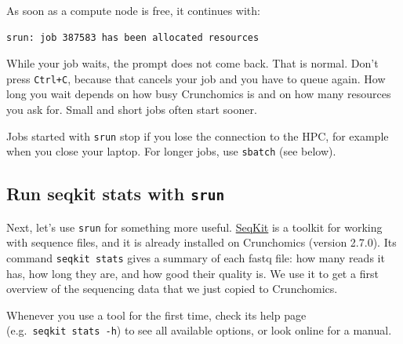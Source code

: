 \documentclass[
  letterpaper,
  DIV=11,
  numbers=noendperiod]{scrreprt}
\begin{document}
As soon as a compute node is free, it continues with:

\begin{verbatim}
srun: job 387583 has been allocated resources
\end{verbatim}

While your job waits, the prompt does not come back. That is normal.
Don't press \texttt{Ctrl+C}, because that cancels your job and you have
to queue again. How long you wait depends on how busy Crunchomics is and
on how many resources you ask for. Small and short jobs often start
sooner.

\begin{tcolorbox}[enhanced jigsaw, colbacktitle=quarto-callout-important-color!10!white, rightrule=.15mm, leftrule=.75mm, colback=white, opacitybacktitle=0.6, title=\textcolor{quarto-callout-important-color}{\faExclamation}\hspace{0.5em}{Important}, bottomrule=.15mm, left=2mm, colframe=quarto-callout-important-color-frame, opacityback=0, breakable, bottomtitle=1mm, coltitle=black, arc=.35mm, toprule=.15mm, toptitle=1mm, titlerule=0mm]

Jobs started with \texttt{srun} stop if you lose the connection to the
HPC, for example when you close your laptop. For longer jobs, use
\texttt{sbatch} (see below).

\end{tcolorbox}

\subsection{\texorpdfstring{Run seqkit stats with
\texttt{srun}}{Run seqkit stats with srun}}\label{run-seqkit-stats-with-srun}

Next, let's use \texttt{srun} for something more useful.
\href{https://bioinf.shenwei.me/seqkit/}{SeqKit} is a toolkit for
working with sequence files, and it is already installed on Crunchomics
(version 2.7.0). Its command \texttt{seqkit\ stats} gives a summary of
each fastq file: how many reads it has, how long they are, and how good
their quality is. We use it to get a first overview of the sequencing
data that we just copied to Crunchomics.

Whenever you use a tool for the first time, check its help page
(e.g.~\texttt{seqkit\ stats\ -h}) to see all available options, or look
online for a manual.
\end{document}
